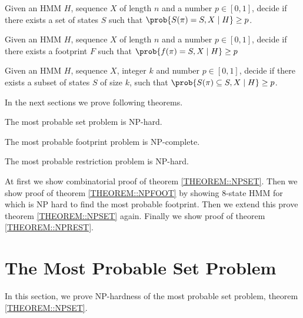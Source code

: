 \begin{definition} Given an HMM $H$, sequence $X$ of
length $n$ and a number $p\in [0,1]$, decide if there exists a set of states $S$
such that $\prob{S(\pi) = S, X\mid H} \geq p$.
\end{definition}

\begin{definition}
 Given an HMM $H$, sequence $X$
of length $n$ and a number $p\in [0,1]$, decide if there exists a footprint $F$
such that $\prob{f(\pi) = S, X\mid H}\geq p$
\end{definition}

\begin{definition}
Given an HMM $H$, sequence $X$, integer $k$ and number $p\in[0,1]$, decide if
there exists a subset of states $S$ of size $k$, such that
$\prob{S(\pi)\subseteq S, X\mid H} \geq p$.
\end{definition}

In the next sections we prove following theorems.
\begin{theorem}
The most probable set problem is NP-hard. \label{THEOREM::NPSET}
\end{theorem}

\begin{theorem}
The most probable footprint problem is NP-complete.
\label{THEOREM::NPFOOT}
\end{theorem}

\begin{theorem}
The most probable restriction problem is NP-hard. \label{THEOREM::NPREST}
\end{theorem}

At first we show combinatorial proof of theorem \ref{THEOREM::NPSET}. Then we
show proof of theorem \ref{THEOREM::NPFOOT} by showing $8$-state HMM for 
which is NP hard to find the most probable footprint. Then we extend this prove
theorem \ref{THEOREM::NPSET} again. Finally we show proof of theorem
\ref{THEOREM::NPREST}.

\section{The Most Probable Set Problem}
\label{sec:set}
In this section, we prove NP-hardness of the most probable set problem, theorem \ref{THEOREM::NPSET}.

